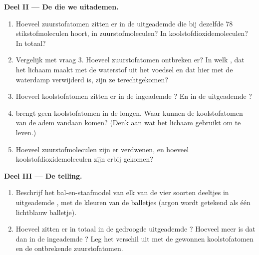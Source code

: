 \begin{problem}
\medskip
\noindent\textbf{Deel II --- De  die we uitademen.}
\begin{enumerate}[resume]
  \item Hoeveel zuurstofatomen zitten er in de uitgeademde  die bij
        dezelfde 78 stikstofmoleculen hoort, in zuurstofmoleculen? In
        koolstofdioxidemoleculen? In totaal?
  \item Vergelijk met vraag 3. Hoeveel zuurstofatomen ontbreken er? In
        welk , dat het lichaam maakt met de waterstof uit het
        voedsel en dat hier met de waterdamp verwijderd is, zijn ze
        terechtgekomen?
  \item Hoeveel koolstofatomen zitten er in de ingeademde ? En in de
        uitgeademde ?
  \item {} brengt geen koolstofatomen in de longen. Waar kunnen de
        koolstofatomen van de adem vandaan komen? (Denk aan wat het
        lichaam gebruikt om te leven.)
  \item Hoeveel zuurstofmoleculen zijn er verdwenen, en hoeveel
        koolstofdioxidemoleculen zijn erbij gekomen?
\end{enumerate}

\medskip
\noindent\textbf{Deel III --- De telling.}
\begin{enumerate}[resume]
  \item Beschrijf het bal-en-staafmodel van elk van de vier soorten
        deeltjes in uitgeademde , met de kleuren van de balletjes
        (argon wordt getekend als één lichtblauw balletje).
  \item Hoeveel  zitten er in totaal in de gedroogde uitgeademde
        ? Hoeveel  meer is dat dan in de ingeademde ? Leg
        het verschil uit met de gewonnen koolstofatomen en de ontbrekende
        zuurstofatomen.
\end{enumerate}
\end{problem}

